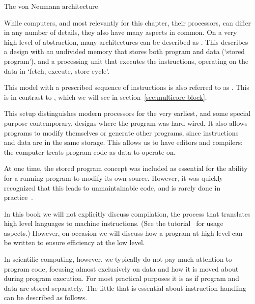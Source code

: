  {The von Neumann architecture}
\label{sec:vonneuman}

While computers, and most relevantly for this chapter, their
processors, can differ in any number of details, they also have many
aspects in common. On a very high level of abstraction, many
architectures can be described as .
This describes a design with an undivided memory
that stores both program and data (`stored program'), and a processing
unit that executes the instructions, operating on the data in `fetch,
execute, store cycle'.

\begin{remark}
This model with a prescribed sequence
  of instructions is also referred to as .
  This is in contrast to , which we will
  see in section~\ref{sec:multicore-block}.
\end{remark}

This setup distinguishes modern processors for the very earliest, and
some special purpose contemporary, designs where the program was
hard-wired. It also allows programs to modify themselves or generate
other programs, since instructions and data are in the same
storage. This allows us to have editors and compilers: the computer
treats program code as data to operate on.
\begin{remark}
At one time, the
  stored program concept was included as essential for the
  ability for a running program to modify its own source. However, it
  was quickly recognized that this leads to unmaintainable code, and
  is rarely done in practice~\cite{EWD:EWD117}.
\end{remark}
In this book we will
not explicitly discuss compilation,
the process that translates high
level languages to machine instructions.
(See the tutorial~ for usage aspects.)
However, on occasion we will
discuss how a program at high level can be written to ensure
efficiency at the low level.

In scientific computing, however, we typically do not pay much
attention to program code, focusing almost exclusively on data and how
it is moved about during program execution.  For most practical
purposes it is as if program and data are stored separately. The
little that is essential about instruction handling can be described
as follows.

